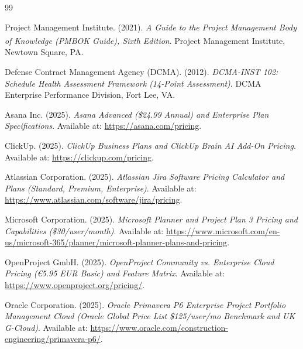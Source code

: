 \documentclass[11pt,a4paper]{report}
\begin{document}


\tableofcontents

\newpage








\begin{thebibliography}{99}
\setlength{\itemsep}{1.5pt}
\setlength{\parskip}{0pt}

Project Management Institute. (2021). \textit{A Guide to the Project Management Body of Knowledge (PMBOK\textsuperscript{\textregistered} Guide), Sixth Edition}. Project Management Institute, Newtown Square, PA.

Defense Contract Management Agency (DCMA). (2012). \textit{DCMA-INST 102: Schedule Health Assessment Framework (14-Point Assessment)}. DCMA Enterprise Performance Division, Fort Lee, VA.

Asana Inc. (2025). \textit{Asana Advanced (\$24.99 Annual) and Enterprise Plan Specifications}. Available at: \url{https://asana.com/pricing}.

ClickUp. (2025). \textit{ClickUp Business Plans and ClickUp Brain AI Add-On Pricing}. Available at: \url{https://clickup.com/pricing}.

Atlassian Corporation. (2025). \textit{Atlassian Jira Software Pricing Calculator and Plans (Standard, Premium, Enterprise)}. Available at: \url{https://www.atlassian.com/software/jira/pricing}.

Microsoft Corporation. (2025). \textit{Microsoft Planner and Project Plan 3 Pricing and Capabilities (\$30/user/month)}. Available at: \url{https://www.microsoft.com/en-us/microsoft-365/planner/microsoft-planner-plans-and-pricing}.

OpenProject GmbH. (2025). \textit{OpenProject Community vs. Enterprise Cloud Pricing (€5.95 EUR Basic) and Feature Matrix}. Available at: \url{https://www.openproject.org/pricing/}.

Oracle Corporation. (2025). \textit{Oracle Primavera P6 Enterprise Project Portfolio Management Cloud (Oracle Global Price List \$125/user/mo Benchmark and UK G-Cloud)}. Available at: \url{https://www.oracle.com/construction-engineering/primavera-p6/}.


\end{thebibliography}
\end{document}
